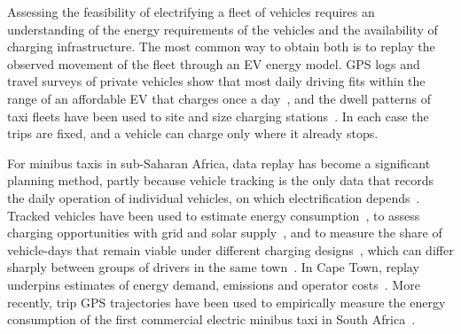 \documentclass{elsarticle}
\begin{document}
Assessing the feasibility of electrifying a fleet of vehicles requires an understanding of the energy requirements of the vehicles and the availability of charging infrastructure. The most common way to obtain both is to replay the observed movement of the fleet through an EV energy model. GPS logs and travel surveys of private vehicles show that most daily driving fits within the range of an affordable EV that charges once a day~\cite{pearre2011_ev_range_required}, and the dwell patterns of taxi fleets have been used to site and size charging stations~\cite{cai2014_beijing_taxi_charging_siting, tu2016_etaxi_charging_location, yang2017_etaxi_siting_sizing}. In each case the trips are fixed, and a vehicle can charge only where it already stops.


For minibus taxis in sub-Saharan Africa, data replay has become a significant planning method, partly because vehicle tracking is the only data that records the daily operation of individual vehicles, on which electrification depends~\cite{rix2022_taxi_tracking_embt_planning}. Tracked vehicles have been used to estimate energy consumption~\cite{hull2023_high_fidelity_paratransit_energy, giliomee2023_simulating_embt_mobility, abraham2025_empirically_validated_embt_sim, sello2026_ekamva_performance}, to assess charging opportunities with grid and solar supply~\cite{abraham2021_solar_embt_charging, booysen2022_embt_load_shedding,sello2026_embt_in_cpt}, and to measure the share of vehicle-days that remain viable under different charging designs~\cite{pretorius2025_viability_existing_mbt_mobility, pretorius2024_grid_mobility_interdependence, booysen2026_cpt_embt_transition}, which can differ sharply between groups of drivers in the same town~\cite{pretorius2024_uneven_transitions}. In Cape Town, replay underpins estimates of energy demand, emissions and operator costs~\cite{sello2026_embt_in_cpt}. More recently, trip GPS trajectories have been used to empirically measure the energy consumption of the first commercial electric minibus taxi in South Africa~\cite{sello2026_ekamva_performance}.

\end{document}
